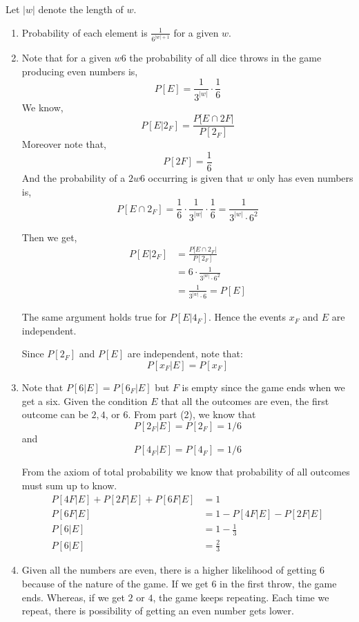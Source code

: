 \documentclass[12pt]{article}
\begin{document}
\begin{solution}
    \bbni
    
    Let $|w|$ denote the length of $w$. 
    \begin{enumerate}
        \item  Probability of each element is $\frac{1}{6^{|w|+1}}$ for a given $w$. 
        
        \item Note that for a given $w6$ the probability of all dice throws in the game producing even numbers is,
        \[P[E] = \frac{1}{3^{|w|}} \cdot \frac{1}{6}\]
        We know,
        \[P[E|2_F] = \frac{P[E\cap 2F|}{P[2_F]}\]
        Moreover note that, 
        \[P[2F] = \frac{1}{6}\] 
        And the probability of a $2w6$ occurring is given that $w$ only has even numbers is, 
        \[P[E\cap2_F] = \frac{1}{6} \cdot \frac{1}{3^{|w|}} \cdot \frac{1}{6} = \frac{1}{3^{|w|} \cdot 6^2}\] 

        Then we get, 
        \begin{align*}
            P[E|2_F] &= \frac{P[E\cap 2_F|}{P[2_F]} \\ 
            &= 6 \cdot \frac{1}{3^{|w|} \cdot 6^2} \\ 
            &= \frac{1}{3^{|w|} \cdot 6} =P[E]  
        \end{align*}
        
        The same argument holds true for $P[E|4_F]$. Hence the events $x_F$ and $E$ are independent.

        Since $P[2_F]$ and $P[E]$ are independent, note that:
        \[P[x_F|E] = P[x_F]  \] 
        
        
        
        \item Note that $P[6|E] = P[6_F|E]$ but $F$ is empty since the game ends when we get a six. 
        Given the condition $E$ that all the outcomes are even, the first outcome can be $2, 4$, or $6$. From part (2), we know that \[P[2_F|E] = P[2_F] = 1/6\] and  \[P[4_F|E] = P[4_F] = 1/6\] 

        
        From the axiom of total probability we know that probability of all outcomes must sum up to know. 
        \begin{align*}
            P[4F|E] + P[2F|E] + P[6F|E] &= 1  \\
             P[6F|E] &= 1- P[4F|E] - P[2F|E] \\
            P[6|E] &= 1-\frac{1}{3} \\ 
            P[6|E] &= \frac{2}{3}
        \end{align*}
        
        \item Given all the numbers are even, there is a higher likelihood of getting 6 because of the nature of the game. If we get $6$ in the first throw, the game ends. Whereas, if we get $2$ or $4$, the game keeps repeating. Each time we repeat, there is possibility of getting an even number gets lower. 
    \end{enumerate}
\end{solution}
\end{document}
